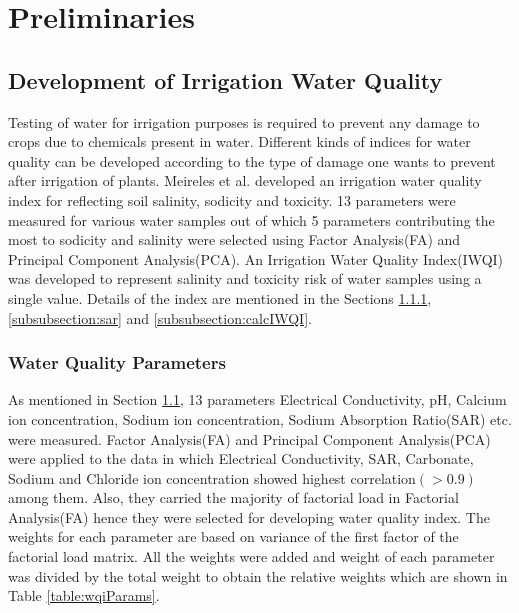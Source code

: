 \section{Preliminaries}
\label{section:preliminaries}

\subsection{Development of Irrigation Water Quality}
\label{subsection:devIWQI}
Testing of water for irrigation purposes is required to prevent any damage to crops due to chemicals present in water. Different kinds of indices for water quality can be developed according to the type of damage one wants to prevent after irrigation of plants. Meireles et al. developed an irrigation water quality index for reflecting soil salinity, sodicity and toxicity. 13 parameters were measured for various water samples out of which 5 parameters contributing the most to sodicity and salinity were selected using Factor Analysis(FA) and Principal Component Analysis(PCA). An Irrigation Water Quality Index(IWQI) was developed to represent salinity and toxicity risk of water samples using a single value. Details of the index are mentioned in the Sections \ref{subsubsection:WaterQualityParameters}, \ref{subsubsection:sar} and \ref{subsubsection:calcIWQI}. 

\subsubsection{Water Quality Parameters}
\label{subsubsection:WaterQualityParameters}
As mentioned in Section \ref{subsection:devIWQI}, 13 parameters Electrical Conductivity, pH, Calcium ion concentration, Sodium ion concentration, Sodium Absorption Ratio(SAR) etc. were measured. Factor Analysis(FA) and Principal Component Analysis(PCA) were applied to the data in which Electrical Conductivity, SAR, Carbonate, Sodium and Chloride ion concentration showed highest correlation$(>0.9)$ among them. Also, they carried the majority of factorial load in Factorial Analysis(FA) hence they were selected for developing water quality index. The weights for each parameter are based on variance of the first factor of the factorial load matrix\cite{article:irrigationWaterQuality}. All the weights were added and weight of each parameter was divided by the total weight to obtain the relative weights which are shown in Table \ref{table:wqiParams}. 

